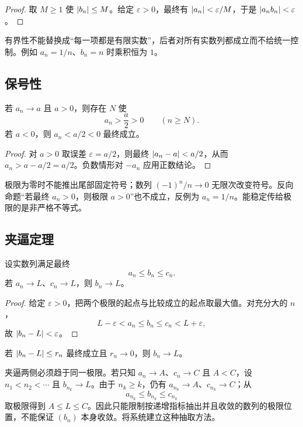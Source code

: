 \begin{proof}
取 \(M\ge1\) 使 \(\left|b_n\right|\le M\)。给定 \(\varepsilon>0\)，最终有
\(\left|a_n\right|<\varepsilon/M\)，于是
\(\left|a_nb_n\right|<\varepsilon\)。
\end{proof}

有界性不能替换成“每一项都是有限实数”，后者对所有实数列都成立而不给统一控制。例如 \(a_n=1/n\)、\(b_n=n\) 时乘积恒为 \(1\)。

\subsection{保号性}

\begin{theorem}[局部保号]
若 \(a_n\to a\) 且 \(a>0\)，则存在 \(N\) 使
\[
 a_n>\frac a2>0\qquad(n\ge N).
\]
若 \(a<0\)，则 \(a_n<a/2<0\) 最终成立。
\end{theorem}

\begin{proof}
对 \(a>0\) 取误差 \(\varepsilon=a/2\)，则最终
\(\left|a_n-a\right|<a/2\)，从而 \(a_n>a-a/2=a/2\)。负数情形对 \(-a_n\) 应用正数结论。
\end{proof}

极限为零时不能推出尾部固定符号；数列 \((-1)^n/n\to0\) 无限次改变符号。反向命题“若最终 \(a_n>0\)，则极限 \(a>0\)”也不成立，反例为 \(a_n=1/n\)。能稳定传给极限的是非严格不等式。

\subsection{夹逼定理}

\begin{theorem}[夹逼定理]
设实数列满足最终
\[
 a_n\le b_n\le c_n.
\]
若 \(a_n\to L\)、\(c_n\to L\)，则 \(b_n\to L\)。
\end{theorem}

\begin{proof}
给定 \(\varepsilon>0\)，把两个极限的起点与比较成立的起点取最大值。对充分大的 \(n\)，
\[
 L-\varepsilon<a_n\le b_n\le c_n<L+\varepsilon,
\]
故 \(\left|b_n-L\right|<\varepsilon\)。
\end{proof}

\begin{corollary}
若 \(\left|b_n-L\right|\le r_n\) 最终成立且 \(r_n\to0\)，则 \(b_n\to L\)。
\end{corollary}

夹逼两侧必须趋于同一极限。若只知 \(a_n\to A\)、\(c_n\to C\) 且 \(A<C\)，设
\(n_1<n_2<\cdots\) 且 \(b_{n_k}\to L\)。由于 \(n_k\ge k\)，仍有
\(a_{n_k}\to A\)、\(c_{n_k}\to C\)；从
\[
 a_{n_k}\le b_{n_k}\le c_{n_k}
\]
取极限得到 \(A\le L\le C\)。因此只能限制按递增指标抽出并且收敛的数列的极限位置，不能保证 \((b_n)\) 本身收敛。将系统建立这种抽取方法。

